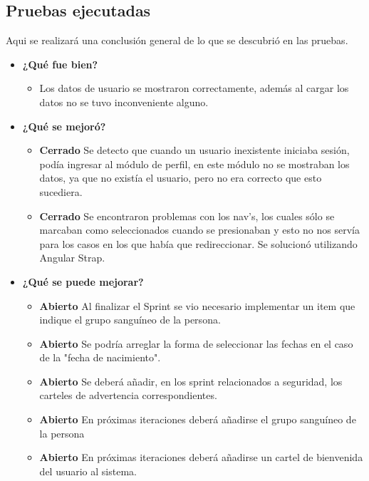 \subsection{Pruebas ejecutadas}
Aqui se realizará una conclusión general de lo que se descubrió en las pruebas.
	\begin{itemize}
		\item \textbf{¿Qué fue bien?}
        	\begin{itemize}
				\item Los datos de usuario se mostraron correctamente, además al cargar  los datos no se tuvo inconveniente alguno.
			\end{itemize}
   		\item \textbf{¿Qué se mejoró?}
        	\begin{itemize}
				\item \textbf{Cerrado}  Se detecto que cuando un usuario inexistente iniciaba sesión, podía ingresar al módulo de perfil, en este módulo no se mostraban los datos, ya que no existía  el usuario, pero no era correcto que esto sucediera.
                \item \textbf{Cerrado} Se encontraron problemas  con los nav's, los cuales sólo se marcaban como seleccionados cuando se presionaban y esto no nos servía para los casos en los que había que redireccionar. Se solucionó utilizando Angular Strap.
                
			\end{itemize}
   		\item \textbf{¿Qué se puede mejorar?}
        	\begin{itemize}
				\item \textbf{Abierto} Al finalizar el Sprint se vio necesario implementar un item que indique el grupo sanguíneo de la persona.
                \item \textbf{Abierto} Se podría arreglar la forma de seleccionar las fechas en el caso de la "fecha de nacimiento".
                \item \textbf{Abierto} Se deberá añadir, en los sprint relacionados a seguridad, los carteles de advertencia correspondientes.
                \item \textbf{Abierto} En próximas iteraciones deberá añadirse el grupo sanguíneo de la persona
                \item \textbf{Abierto} En próximas iteraciones deberá añadirse un cartel de bienvenida del usuario al sistema.
			\end{itemize}
    \end{itemize}